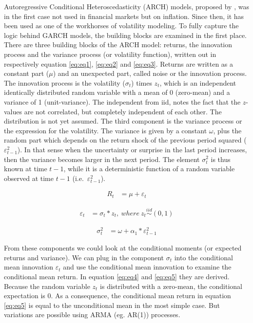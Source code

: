 \documentclass[a4paper, twoside]{templates/ociamthesis}
\begin{document}
Autoregressive Conditional Heteroscedasticity (ARCH) models, proposed by \textcite{engle1982}, was in the first case not used in financial markets but on inflation. Since then, it has been used as one of the workhorses of volatility modeling. To fully capture the logic behind GARCH models, the building blocks are examined in the first place. There are three building blocks of the ARCH model: returns, the innovation process and the variance process (or volatility function), written out in respectively equation \eqref{eq:eq1}, \eqref{eq:eq2} and \eqref{eq:eq3}. Returns are written as a constant part (\(\mu\)) and an unexpected part, called noise or the innovation process. The innovation process is the volatility (\(\sigma_t\)) times \(z_t\), which is an independent identically distributed random variable with a mean of 0 (zero-mean) and a variance of 1 (unit-variance). The independent from iid, notes the fact that the \(z\)-values are not correlated, but completely independent of each other. The distribution is not yet assumed. The third component is the variance process or the expression for the volatility. The variance is given by a constant \(\omega\), plus the random part which depends on the return shock of the previous period squared (\(\varepsilon_{t-1}^2\)). In that sense when the uncertainty or surprise in the last period increases, then the variance becomes larger in the next period. The element \(\sigma_t^2\) is thus known at time \(t-1\), while it is a deterministic function of a random variable observed at time \(t-1\) (i.e.~\(\varepsilon_{t-1}^2\)).

\begin{align} 
R_{t} &= \mu + \varepsilon_t
 \label{eq:eq1}
\end{align}

\begin{align} 
\varepsilon_{t} &= \sigma_t * z_t, \ where \ z_t \stackrel{iid}{\sim} (0,1)
 \label{eq:eq2}
\end{align} 

\begin{align} 
\sigma_{t}^{2} &= \omega + \alpha_1 *  \varepsilon_{t-1}^2 
 \label{eq:eq3}
\end{align}

From these components we could look at the conditional moments (or expected returns and variance). We can plug in the component \(\sigma_t\) into the conditional mean innovation \(\varepsilon_{t}\) and use the conditional mean innovation to examine the conditional mean return. In equation \eqref{eq:eq4} and \eqref{eq:eq5} they are derived. Because the random variable \(z_t\) is distributed with a zero-mean, the conditional expectation is 0. As a consequence, the conditional mean return in equation \eqref{eq:eq5} is equal to the unconditional mean in the most simple case. But variations are possible using ARMA (eg. AR(1)) processes.
\end{document}
